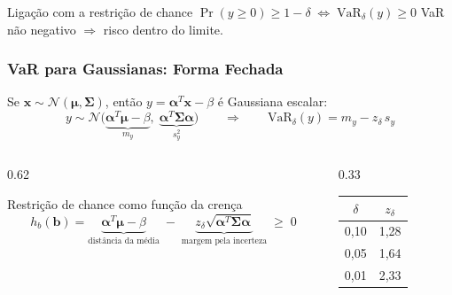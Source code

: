 \begin{frame}
\begin{columns}[c]
    \end{columns}

    \begin{block}{Ligação com a restrição de chance}
        $\Pr(y \geq 0) \geq 1 - \delta \;\Longleftrightarrow\; \mathrm{VaR}_\delta(y) \geq 0$
        \hfill
        {\small VaR não negativo $\Rightarrow$ risco dentro do limite.}
    \end{block}

\end{frame}


\begin{frame}

    \frametitle{VaR para Gaussianas: Forma Fechada}

    Se $\boldsymbol{x} \sim \mathcal{N}(\boldsymbol{\mu}, \boldsymbol{\Sigma})$, então $y = \boldsymbol{\alpha}^T\boldsymbol{x} - \beta$ é Gaussiana escalar:
    \[
        y \sim \mathcal{N}\big(\underbrace{\boldsymbol{\alpha}^T\boldsymbol{\mu} - \beta}_{m_y},\; \underbrace{\boldsymbol{\alpha}^T\boldsymbol{\Sigma}\boldsymbol{\alpha}}_{s_y^2}\big)
        \qquad \Rightarrow \qquad
        \mathrm{VaR}_\delta(y) = m_y - z_\delta\, s_y
    \]

    \begin{columns}[c]

        \begin{column}{0.62\textwidth}
            \begin{block}{Restrição de chance como função da crença}
                \[
                    h_b(\boldsymbol{b}) =
                    \underbrace{\boldsymbol{\alpha}^T\boldsymbol{\mu} - \beta}_{\text{distância da média}}
                    \;-\;
                    \underbrace{z_\delta \sqrt{\boldsymbol{\alpha}^T\boldsymbol{\Sigma}\boldsymbol{\alpha}}}_{\text{margem pela incerteza}}
                    \;\geq\; 0
                \]
            \end{block}
        \end{column}

        \begin{column}{0.33\textwidth}
            \centering
            \small
            \begin{tabular}{cc}
                \toprule
                $\delta$ & $z_\delta$ \\
                \midrule
                0,10 & 1,28 \\
                0,05 & 1,64 \\
                0,01 & 2,33 \\
                \bottomrule
            \end{tabular}


\end{column}
\end{columns}
\end{frame}

